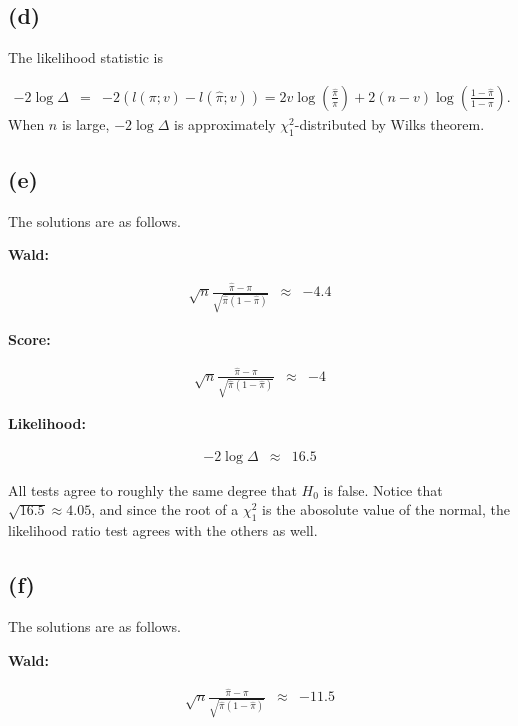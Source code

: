 \subsection*{(d)}

The likelihood statistic is

\begin{eqnarray*}
-2\log\Delta & = & -2(l(\pi;v)-l(\hat{\pi};v))=2v\log\left(\frac{\hat{\pi}}{\pi}\right)+2(n-v)\log\left(\frac{1-\hat{\pi}}{1-\pi}\right).
\end{eqnarray*}
When $n$ is large, $-2\log\Delta$ is approximately $\chi_{1}^{2}$-distributed
by Wilks theorem.

\subsection*{(e)}

The solutions are as follows.

\textbf{Wald:}

\begin{eqnarray*}
\sqrt{n}\frac{\hat{\pi}-\pi}{\sqrt{\hat{\pi}(1-\hat{\pi})}} & \approx & -4.4
\end{eqnarray*}

\textbf{Score:}

\begin{eqnarray*}
\sqrt{n}\frac{\hat{\pi}-\pi}{\sqrt{\hat{\pi}(1-\hat{\pi})}} & \approx & -4
\end{eqnarray*}

\textbf{Likelihood:}

\begin{eqnarray*}
-2\log\Delta & \approx & 16.5
\end{eqnarray*}

All tests agree to roughly the same degree that $H_{0}$ is false.
Notice that $\sqrt{16.5}\approx4.05$, and since the root of a $\chi_{1}^{2}$
is the abosolute value of the normal, the likelihood ratio test agrees
with the others as well.

\subsection*{(f)}

The solutions are as follows.

\textbf{Wald:}

\begin{eqnarray*}
\sqrt{n}\frac{\hat{\pi}-\pi}{\sqrt{\hat{\pi}(1-\hat{\pi})}} & \approx & -11.5
\end{eqnarray*}

